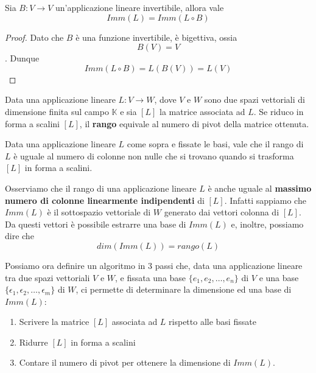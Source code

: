 \begin{proposition}
	Sia $B : V \to V$ un'applicazione lineare invertibile, allora vale
	\[ Imm(L) = Imm(L \circ B) \]
	\begin{proof}
		Dato che $B$ \`e una funzione invertibile, \`e bigettiva, ossia
		\[ B(V) = V \]. Dunque
		\begin{equation*}
			Imm(L \circ B) = L(B(V)) = L(V)
		\end{equation*}
	\end{proof}
\end{proposition}

\begin{defn}
	Data una applicazione lineare $L : V \to W$, dove $V$ e $W$ sono due spazi
	vettoriali di dimensione finita sul campo $\mathbb{K}$ e sia $[L]$ la matrice 
	associata ad $L$. Se riduco in forma a scalini $[L]$, il \textbf{rango} equivale
	al numero di pivot della matrice ottenuta.
\end{defn}

\begin{theorem}
	Data una applicazione lineare $L$ come sopra e fissate le basi, vale che
	il rango di $L$ \`e uguale al numero di colonne non nulle che si trovano
	quando si trasforma $[L]$ in forma a scalini.
\end{theorem}

\begin{observation}
	Osserviamo che il rango di una applicazione lineare $L$ \`e anche uguale al
	\textbf{massimo numero di colonne linearmente indipendenti} di $[L]$.
	Infatti sappiamo che $Imm(L)$ \`e il sottospazio vettoriale di $W$ generato
	dai vettori colonna di $[L]$. Da questi vettori \`e possibile estrarre una
	base di $Imm(L)$ e, inoltre, possiamo dire che \[dim(Imm(L)) = rango (L)\]
\end{observation}

\begin{observation}
	Possiamo ora definire un algoritmo in 3 passi che, data una
	applicazione lineare tra due spazi vettoriali $V$ e $W$, e fissata una base
	$\{e_1, e_2, \dots, e_n\}$ di $V$ e una base
	$\{\epsilon_1, \epsilon_2, \dots, \epsilon_m\}$ di $W$, ci permette di
	determinare la dimensione ed una base di $Imm(L)$:
	\begin{enumerate}
		\item Scrivere la matrice $[L]$ associata ad $L$ rispetto alle basi
		      fissate
		\item Ridurre $[L]$ in forma a scalini
		\item Contare il numero di pivot per ottenere la dimensione di $Imm(L)$.
	\end{enumerate}
\end{observation}